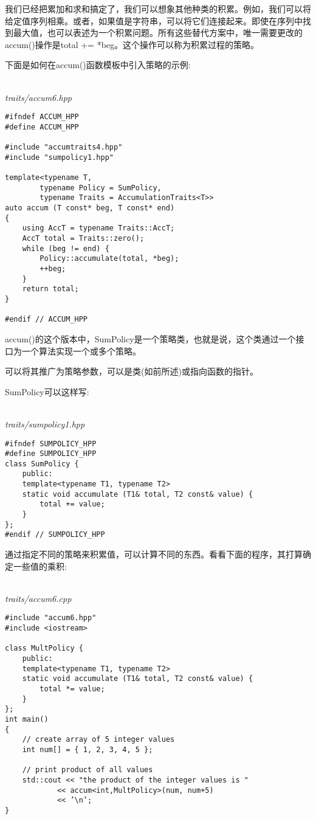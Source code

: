 
我们已经把累加和求和搞定了，我们可以想象其他种类的积累。例如，我们可以将给定值序列相乘。或者，如果值是字符串，可以将它们连接起来。即使在序列中找到最大值，也可以表述为一个积累问题。所有这些替代方案中，唯一需要更改的accum()操作是total += *beg。这个操作可以称为积累过程的策略。

下面是如何在accum()函数模板中引入策略的示例:

\hspace*{\fill} \\ %
\noindent
\textit{traits/accum6.hpp}
\begin{lstlisting}[style=styleCXX]
#ifndef ACCUM_HPP
#define ACCUM_HPP

#include "accumtraits4.hpp"
#include "sumpolicy1.hpp"

template<typename T,
		typename Policy = SumPolicy,
		typename Traits = AccumulationTraits<T>>
auto accum (T const* beg, T const* end)
{
	using AccT = typename Traits::AccT;
	AccT total = Traits::zero();
	while (beg != end) {
		Policy::accumulate(total, *beg);
		++beg;
	}
	return total;
}

#endif // ACCUM_HPP
\end{lstlisting}

accum()的这个版本中，SumPolicy是一个策略类，也就是说，这个类通过一个接口为一个算法实现一个或多个策略。

\begin{tcolorbox}[colback=webgreen!5!white,colframe=webgreen!75!black]
\hspace*{0.75cm}可以将其推广为策略参数，可以是类(如前所述)或指向函数的指针。
\end{tcolorbox}

SumPolicy可以这样写:

\hspace*{\fill} \\ %
\noindent
\textit{traits/sumpolicy1.hpp}
\begin{lstlisting}[style=styleCXX]
#ifndef SUMPOLICY_HPP
#define SUMPOLICY_HPP
class SumPolicy {
	public:
	template<typename T1, typename T2>
	static void accumulate (T1& total, T2 const& value) {
		total += value;
	}
};
#endif // SUMPOLICY_HPP
\end{lstlisting}

通过指定不同的策略来积累值，可以计算不同的东西。看看下面的程序，其打算确定一些值的乘积:

\hspace*{\fill} \\ %
\noindent
\textit{traits/accum6.cpp}
\begin{lstlisting}[style=styleCXX]
#include "accum6.hpp"
#include <iostream>

class MultPolicy {
	public:
	template<typename T1, typename T2>
	static void accumulate (T1& total, T2 const& value) {
		total *= value;
	}
};
int main()
{
	// create array of 5 integer values
	int num[] = { 1, 2, 3, 4, 5 };
	
	// print product of all values
	std::cout << "the product of the integer values is "
			<< accum<int,MultPolicy>(num, num+5)
			<< ’\n’;
}
\end{lstlisting}

